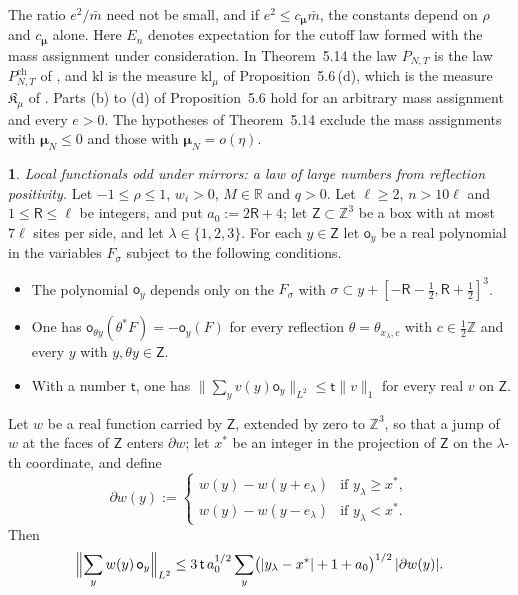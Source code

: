 \documentclass[11pt]{amsart}
\newcommand{\namedhead}{}
\theoremstyle{definition}
\newtheorem*{namedinner}{\namedhead}
\newenvironment{named}[1]{\renewcommand{\namedhead}{#1}\begin{namedinner}}{\end{namedinner}}
\begin{document}
The ratio $e^2/\bar m$ need not be small, and if $e^2\le c_{\boldsymbol\mu}\bar m$, the constants depend on $\rho$ and $c_{\boldsymbol\mu}$ alone.
Here $E_n$ denotes expectation for the cutoff law formed with the mass assignment under consideration.
In Theorem~5.14 the law $P_{N,T}$ is the law $P^{\mathrm{ch}}_{N,T}$ of \cite[Section~1.2]{QEDII}, and $\mathrm{kl}$ is the measure $\mathrm{kl}_\mu$ of Proposition~5.6\,(d), which is the measure $\mathfrak K_\mu$ of \cite[Theorem~1.4, Part~I\,(d)]{QEDII}.
Parts (b) to (d) of Proposition~5.6 hold for an arbitrary mass assignment and every $e>0$.
The hypotheses of Theorem~5.14 exclude the mass assignments with $\boldsymbol\mu_N\le0$ and those with $\boldsymbol\mu_N=o(\eta)$.

\begin{named}{Lemma 5.15}
\emph{Local functionals odd under mirrors: a law of large numbers from reflection positivity.}
Let $-1\le\rho\le1$, $w_i>0$, $M\in\mathbb R$ and $q>0$.
Let $\ell\ge2$, $n>10\ell$ and $1\le\mathsf R\le\ell$ be integers, and put $a_0:=2\mathsf R+4$;
let $\mathsf Z\subset\mathbb Z^3$ be a box with at most $7\ell$ sites per side, and let $\lambda\in\{1,2,3\}$.
For each $y\in\mathsf Z$ let $\mathsf o_y$ be a real polynomial in the variables $F_\sigma$ subject to the following conditions.
\begin{itemize}
\item[\textbf{(L)}] The polynomial $\mathsf o_y$ depends only on the $F_\sigma$ with $\sigma\subset y+[-\mathsf R-\frac12,\mathsf R+\frac12]^3$.
\item[\textbf{(O)}] One has $\mathsf o_{\theta y}(\theta^*F)=-\mathsf o_y(F)$ for every reflection $\theta=\theta_{x_\lambda,c}$ with $c\in\frac12\mathbb Z$ and every $y$ with $y,\theta y\in\mathsf Z$.
\item[\textbf{(S)}] With a number $\mathsf t$, one has $\|\sum_yv(y)\mathsf o_y\|_{L^2}\le\mathsf t\|v\|_1$ for every real $v$ on $\mathsf Z$.
\end{itemize}
Let $w$ be a real function carried by $\mathsf Z$, extended by zero to $\mathbb Z^3$, so that a jump of $w$ at the faces of $\mathsf Z$ enters $\partial w$;
let $x^*$ be an integer in the projection of $\mathsf Z$ on the $\lambda$-th coordinate, and define
\begin{equation*}
\partial w(y):=\begin{cases}w(y)-w(y+e_\lambda)&\text{if }y_\lambda\ge x^*,\\w(y)-w(y-e_\lambda)&\text{if }y_\lambda<x^*.\end{cases}
\end{equation*}
Then
\begin{equation*}
\Bigl\|\sum_yw(y)\,\mathsf o_y\Bigr\|_{L^2}\le3\,\mathsf t\,a_0^{1/2}\sum_y\bigl(|y_\lambda-x^*|+1+a_0\bigr)^{1/2}\,|\partial w(y)|.
\end{equation*}
\end{named}
\end{document}
